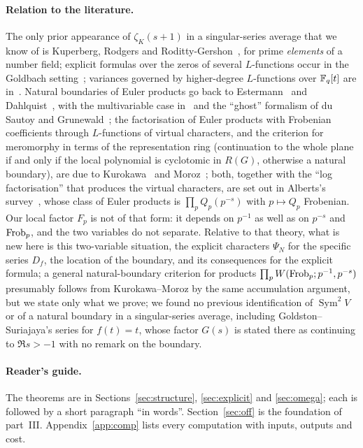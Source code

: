 \documentclass[11pt,a4paper]{article}
\theoremstyle{remark}\newtheorem{remark}[theorem]{Remark}
\newcommand{\Sym}{\operatorname{Sym}}\newcommand{\Res}{\operatorname*{Res}}
\begin{document}
\paragraph{Relation to the literature.} The only prior appearance of $\zeta_K(s+1)$ in a singular-series
average that we know of is Kuperberg, Rodgers and Roditty-Gershon~\cite{KuperbergRodgersRodittyGershon2022},
for prime \emph{elements} of a number field; explicit formulas over the zeros of several $L$-functions occur
in the Goldbach setting~\cite{BhowmikHalupczokMatsumotoSuzuki2019,GoldstonSuriajaya2023}; variances
governed by higher-degree $L$-functions over $\mathbb{F}_q[t]$ are in~\cite{HallKeatingRodittyGershon2019}. Natural
boundaries of Euler products go back to Estermann~\cite{Estermann1928} and Dahlquist~\cite{Dahlquist1952},
with the multivariable case in~\cite{BhowmikEssouabriLichtin2007} and the ``ghost'' formalism of du Sautoy
and Grunewald~\cite{duSautoyGrunewald2002}; the factorisation of Euler products with Frobenian coefficients through $L$-functions of virtual
characters, and the criterion for meromorphy in terms of the representation ring (continuation to the whole
plane if and only if the local polynomial is cyclotomic in $R(G)$, otherwise a natural boundary), are due to
Kurokawa~\cite{Kurokawa1986} and Moroz~\cite{Moroz1988}; both, together with the ``log factorisation'' that
produces the virtual characters, are set out in Alberts's survey~\cite{Alberts2024}, whose class of Euler
products is $\prod_pQ_p(p^{-s})$ with $p\mapsto Q_p$ Frobenian. Our local factor $F_p$ is not of that form: it
depends on $p^{-1}$ as well as on $p^{-s}$ and $\operatorname{Frob}_p$, and the two variables do not separate. Relative to
that theory, what is new here is this two-variable situation, the explicit characters $\Psi_N$ for the
specific series $D_f$, the location of the boundary, and its consequences for the explicit formula; a general
natural-boundary criterion for products $\prod_pW(\operatorname{Frob}_p;p^{-1},p^{-s})$ presumably follows from
Kurokawa--Moroz by the same accumulation argument, but we state only what we prove; we found no previous identification of $\Sym^2V$ or of a natural
boundary in a singular-series average, including Goldston--Suriajaya's series for $f(t)=t$, whose factor
$G(s)$ is stated there as continuing to $\Re s>-1$ with no remark on the boundary.

\paragraph{Reader's guide.} The theorems are in Sections~\ref{sec:structure}, \ref{sec:explicit} and
\ref{sec:omega}; each is followed by a short paragraph ``in words''. Section~\ref{sec:off} is the foundation
of part~III. Appendix~\ref{app:comp} lists every computation with inputs, outputs and cost.
\end{document}
